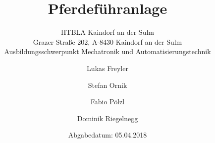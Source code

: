 \documentclass
[
a4paper,															%
12pt,																%
twoside=true,														%
openright,															%
titlepage,															%
headinclude,														%
numbers=noenddot,													%
listof=numbered,													%
bibliography=totocnumbered,											%
]
{scrbook}															%
\title{Pferdeführanlage}
\subtitle{HTBLA Kaindorf an der Sulm\\
Grazer Straße 202, A-8430 Kaindorf an der Sulm\\
Ausbildungsschwerpunkt Mechatronik und Automatisierungstechnik}
\author{Lukas Freyler \and Stefan Ornik \and Fabio Pölzl \and Dominik Riegelnegg}
\date{Abgabedatum: 05.04.2018}
\begin{document}
\onehalfspace														%
\maketitle															%
\tableofcontents													%
\mainmatter															%
\end{document}
